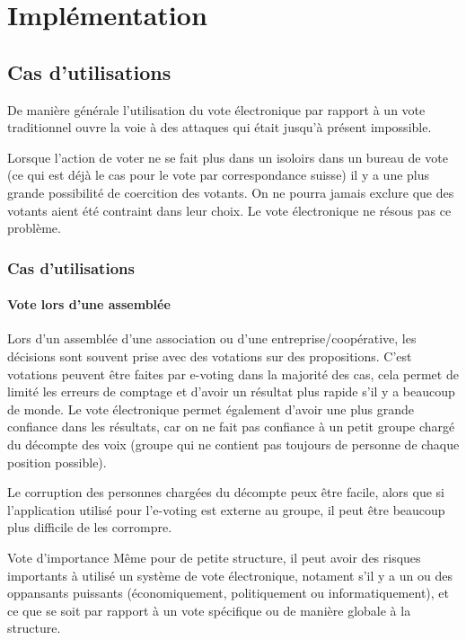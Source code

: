 \documentclass[../report]{subfiles}
\begin{document}
\part{Implémentation}

\chapter{Cas d'utilisations}\label{chap:usecase}

De manière générale l'utilisation du vote électronique par rapport à un vote traditionnel ouvre la voie à 
des attaques qui était jusqu'à présent impossible. 

Lorsque l'action de voter ne se fait plus dans un isoloirs dans un bureau de vote (ce qui est déjà le cas
pour le vote par correspondance suisse) il y a une plus grande possibilité de coercition des votants.
On ne pourra jamais exclure que des votants aient été contraint dans leur choix. 
Le vote électronique ne résous pas ce problème.

\section{Cas d'utilisations}
\subsection{Vote lors d'une assemblée}

Lors d'un assemblée d'une association ou d'une entreprise/coopérative, les décisions sont souvent prise avec
des votations sur des propositions.
C'est votations peuvent être faites par e-voting dans la majorité des cas, cela permet de limité les erreurs 
de comptage et d'avoir un résultat plus rapide s'il y a beaucoup de monde.
Le vote électronique permet également d'avoir une plus grande confiance dans les résultats, car on ne fait pas 
confiance à un petit groupe chargé du décompte des voix (groupe qui ne contient pas toujours de personne de 
chaque position possible).

Le corruption des personnes chargées du décompte peux être facile, alors que si l'application utilisé pour
l'e-voting est externe au groupe, il peut être beaucoup plus difficile de les corrompre.

\begin{important}{Vote d'importance}
	Même pour de petite structure, il peut avoir des risques importants à utilisé un système de vote électronique, 
	notament s'il y a un ou des oppansants puissants (économiquement, politiquement ou informatiquement), et ce que
	se soit par rapport à un vote spécifique ou de manière globale à la structure.
\end{important}
\end{document}
